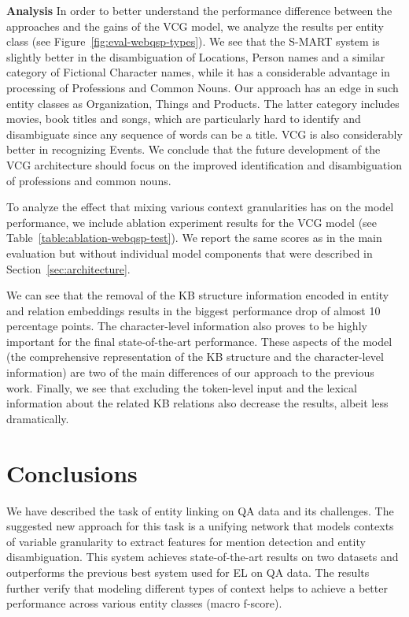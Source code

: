 \documentclass[11pt,a4paper]{article}
\begin{document}
\textbf{Analysis} In order to better understand the performance difference between the approaches and the gains of the VCG model, we analyze the results per entity class (see Figure~\ref{fig:eval-webqsp-types}). We see that the \mbox{S-MART} system is slightly better in the disambiguation of Locations, Person names and a similar category of Fictional Character names, while it has a considerable advantage in processing of Professions and Common Nouns. Our approach has an edge in such entity classes as Organization, Things and Products. The latter category includes movies, book titles and songs, which are particularly hard to identify and disambiguate since any sequence of words can be a title. VCG is also considerably better in recognizing Events. We conclude that the future development of the VCG architecture should focus on the improved identification and disambiguation of professions and common nouns.


To analyze the effect that mixing various context granularities has on the model performance, we include ablation experiment results for the VCG model (see Table~\ref{table:ablation-webqsp-test}). We report the same scores as in the main evaluation but without individual model components that were described in Section~\ref{sec:architecture}.

We can see that the removal of the KB structure information encoded in entity and relation embeddings results in the biggest performance drop of almost 10 percentage points. The character-level information also proves to be highly important for the final state-of-the-art performance. These aspects of the model (the comprehensive representation of the KB structure and the character-level information) are two of the main differences of our approach to the previous work. Finally, we see that excluding the token-level input and the lexical information about the related KB relations also decrease the results, albeit less dramatically.


\section{Conclusions}

We have described the task of entity linking on QA data and its challenges. The suggested new approach for this task is a unifying network that models contexts of variable granularity to extract features for mention detection and entity disambiguation. This system achieves state-of-the-art results on two datasets and outperforms the previous best system used for EL on QA data. The results further verify that modeling different types of context helps to achieve a better performance across various entity classes (macro f-score). 
\end{document}
